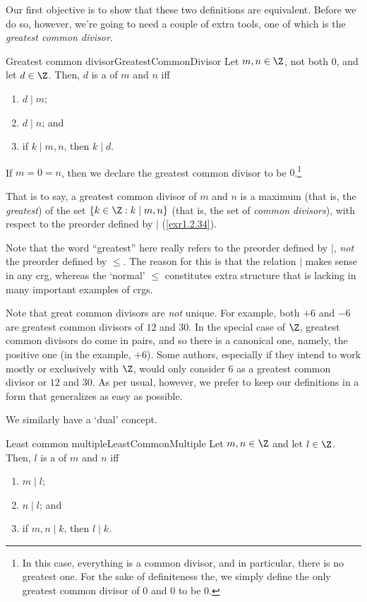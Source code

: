 Our first objective is to show that these two definitions are equivalent.  Before we do so, however, we're going to need a couple of extra tools, one of which is the \emph{greatest common divisor}.
\begin{dfn}{Greatest common divisor}{GreatestCommonDivisor}
Let $m,n\in \Z$, not both $0$, and let $d\in \Z$.  Then, $d$ is a  of $m$ and $n$ iff
\begin{enumerate}
\item $d\mid m$;
\item $d\mid n$; and
\item if $k\mid m,n$, then $k\mid d$.
\end{enumerate}
If $m=0=n$, then we declare the greatest common divisor to be $0$.\footnote{In this case, everything is a common divisor, and in particular, there is no greatest one.  For the sake of definiteness the, we simply define the only greatest common divisor of $0$ and $0$ to be $0$.}
\begin{rmk}
That is to say, a greatest common divisor of $m$ and $n$ is a maximum (that is, the \emph{greatest}) of the set $\{ k\in \Z :k\mid m,n\}$ (that is, the set of \emph{common divisors}), with respect to the preorder defined by $\mid$ (\cref{exr1.2.34}).
\end{rmk}
\begin{rmk}
Note that the word ``greatest'' here really refers to the preorder defined by $\mid$, \emph{not} the preorder defined by $\leq$.  The reason for this is that the relation $\mid$ makes sense in any crg, whereas the `normal' $\leq$ constitutes extra structure that is lacking in many important examples of crgs.
\end{rmk}
\begin{rmk}
Note that great common divisors are \emph{not} unique.  For example, both $+6$ and $-6$ are greatest common divisors of $12$ and $30$.  In the special case of $\Z$, greatest common divisors do come in pairs, and so there is a canonical one, namely, the positive one (in the example, $+6$).  Some authors, especially if they intend to work mostly or exclusively with $\Z$, would only consider $6$ as a greatest common divisor or $12$ and $30$.  As per usual, however, we prefer to keep our definitions in a form that generalizes as easy as possible.
\end{rmk}
\end{dfn}
We similarly have a `dual' concept.
\begin{dfn}{Least common multiple}{LeastCommonMultiple}
Let $m,n\in \Z$ and let $l\in \Z$.  Then, $l$ is a  of $m$ and $n$ iff
\begin{enumerate}
\item $m\mid l$;
\item $n\mid l$; and
\item if $m,n\mid k$, then $l\mid k$.
\end{enumerate}
\end{dfn}
